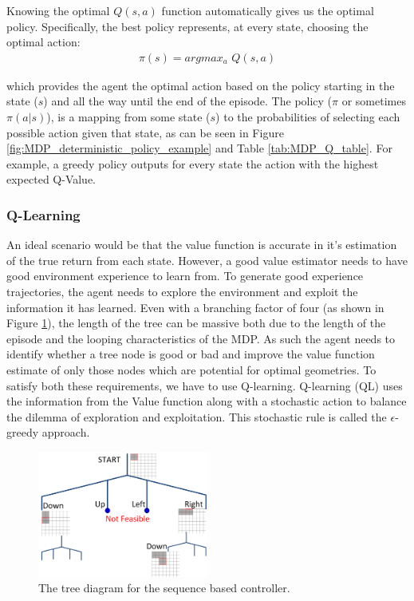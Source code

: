 \hspace{14pt}

Knowing the optimal $Q(s,a)$ function automatically gives us the optimal policy. Specifically, the best policy represents, at every state, choosing the optimal action:
\begin{align}
    \pi(s) = argmax_{a} \hspace{4pt} Q(s,a)
\end{align}

which provides the agent the optimal action based on the policy starting in the state ($s$) and all the way until the end of the episode. The policy ($\pi$ or sometimes $\pi(a|s)$), is a mapping from some state ($s$) to the probabilities of selecting each possible action given that state, as can be seen in Figure \ref{fig:MDP_deterministic_policy_example} and Table \ref{tab:MDP_Q_table}. For example, a greedy policy outputs for every state the action with the highest expected Q-Value.

\subsubsection{Q-Learning}
\label{subsubsec:MDP_Q_learning}

An ideal scenario would be that the value function is accurate in it's estimation of the true return from each state. However, a good value estimator needs to have good environment experience to learn from. 
To generate good experience trajectories, the agent needs to explore the environment and exploit the information it has learned.
Even with a branching factor of four (as shown in Figure \ref{fig:MDP_tree_structure}), the length of the tree can be massive both due to the length of the episode and the looping characteristics of the MDP. As such the agent needs to identify whether a tree node is good or bad and improve the value function estimate of only those nodes which are potential for optimal geometries. To satisfy both these requirements, we have to use Q-learning. Q-learning (QL) uses the information from the Value function along with a stochastic action to balance the dilemma of exploration and exploitation. This stochastic rule is called the $\epsilon$-greedy approach. 

\begin{figure}[h!]
    \centering
    \includegraphics[width=0.50\textwidth]{Figures/Ch_MDP/Tree_structure.png}
    \caption{The tree diagram for the sequence based controller.}
    \label{fig:MDP_tree_structure}
\end{figure}

